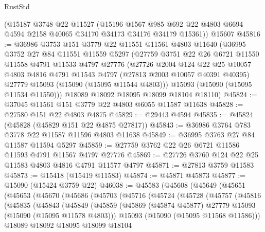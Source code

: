 \begin{lexlean}{RustStd}
\begin{coremodule}
    (@15187
      @3748
      @22
      @11527
      (@15196
        @1567
        @985
        @692
        @22
        @4803
        @6694
        @4594
        @2158
        @40065
        @34170
        @34173
        @34176
        @34179
        @15361))
    @15607
@45816 := @36986
    @3753
    @151
    @3779
    @22
    @11551
    @11561
    @4803
    @11640
    (@36995
      @3752
      @27
      @84
      @11551
      @11559
      @5297
      (@27759
        @3751
        @22
        @26
        @6721
        @11550
        @11558
        @4791
        @11533
        @4797
        @27776
        (@27726
          @2004
          @124
          @22
          @25
          @10057
          @4803
          @4816
          @4791
          @11543
          @4797
          (@27813 @2003 @10057 @40391 @40395)
          @27779
          @15093
          (@15090 (@15095 @11544 @4803)))
        @15093
        (@15090 (@15095 @11534 @11550)))
      @18089
      @18092
      @18095
      @18099
      @18104
      @18110)
@45824 := @37045 @11561 @151 @3779 @22 @4803 @6055 @11587 @11638
@45828 := @27580 @151 @22 @4803 @4875
@45829 := @29443 @4594
@45835 := @45824 (@45828 (@45829 @151 @22 @4875 @27817))
@45843 := @36986 @3764 @783 @3778 @22 @11587 @11596 @4803 @11638
@45849 := @36995 @3763 @27 @84 @11587 @11594 @5297
@45859 := @27759 @3762 @22 @26 @6721 @11586 @11593 @4791 @11567 @4797 @27776
@45869 := @27726 @3760 @124 @22 @25 @11583 @4803 @4816 @4791 @11577 @4797
@45871 := @27813 @3759 @11583
@45873 := @15418 (@15419 @11583)
@45874 := @45871 @45873
@45877 := @15090 (@15424 @3759 @22)
@46038 := @45583
    (@45608
      (@45649
        (@45651
          (@45653
            (@45670
              (@45686
                (@45703
                  (@45716
                    (@45724
                      (@45728
                        (@45757
                          (@45816
                            (@45835
                              (@45843
                                (@45849
                                  (@45859
                                    (@45869
                                      (@45874 @45877)
                                      @27779
                                      @15093
                                      (@15090 (@15095 @11578 @4803)))
                                    @15093
                                    (@15090 (@15095 @11568 @11586)))
                                  @18089
                                  @18092
                                  @18095
                                  @18099
                                  @18104

\end{coremodule}
\end{lexlean}
